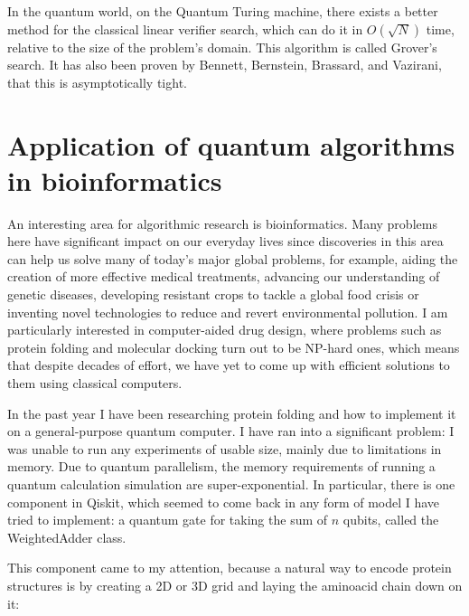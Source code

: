 In the quantum world, on the Quantum Turing machine, there exists a better method for the classical linear verifier search, which can do it in $O(\sqrt{N})$ time, relative to the size of the problem's domain. This algorithm is called Grover's search. It has also been proven by Bennett, Bernstein, Brassard, and Vazirani, that this is asymptotically tight\cite{bennett_strengths_1997}.

\section{Application of quantum algorithms in bioinformatics}

An interesting area for algorithmic research is bioinformatics. Many problems here have significant impact on our everyday lives since discoveries in this area can help us solve many of today’s major global problems, for example, aiding the creation of more effective medical treatments, advancing our understanding of genetic diseases, developing resistant crops to tackle a global food crisis or inventing novel technologies to reduce and revert environmental pollution. I am particularly interested in computer-aided drug design, where problems such as protein folding\cite{crescenzi_complexity_1998} and molecular docking\cite{a_molecular_2018} turn out to be NP-hard ones, which means that despite decades of effort, we have yet to come up with efficient solutions to them using classical computers.

In the past year I have been researching protein folding and how to implement it on a general-purpose quantum computer. I have ran into a significant problem: I was unable to run any experiments of usable size, mainly due to limitations in memory. Due to quantum parallelism, the memory requirements of running a quantum calculation simulation are super-exponential. In particular, there is one component in Qiskit, which seemed to come back in any form of model I have tried to implement: a quantum gate for taking the sum of $n$ qubits, called the WeightedAdder class. 

This component came to my attention, because a natural way to encode protein structures is by creating a 2D or 3D grid and laying the aminoacid chain down on it\cite{dill_principles_2008}:

